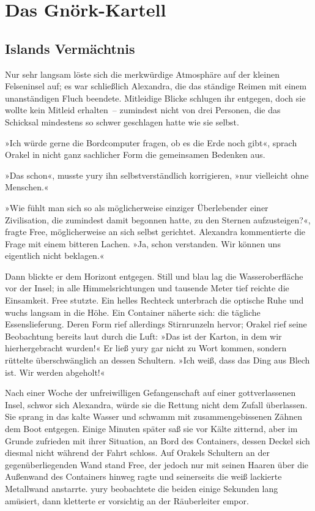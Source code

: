 \cleardoubleevenpage




\part{Das Gnörk-Kartell}

\chapter{Islands Vermächtnis}

Nur sehr langsam löste sich die merkwürdige Atmosphäre auf der kleinen Felseninsel auf; es war schließlich Alexandra, die das ständige Reimen mit einem unanständigen Fluch beendete. Mitleidige Blicke schlugen ihr entgegen, doch sie wollte kein Mitleid erhalten~– zumindest nicht von drei Personen, die das Schicksal mindestens so schwer geschlagen hatte wie sie selbst.

»Ich würde gerne die Bordcomputer fragen, ob es die Erde noch gibt«, sprach Orakel in nicht ganz sachlicher Form die gemeinsamen Bedenken aus.

»Das schon«, musste yury ihn selbstverständlich korrigieren, »nur vielleicht ohne Menschen.«

»Wie fühlt man sich so als möglicherweise einziger Überlebender einer Zivilisation, die zumindest damit begonnen hatte, zu den Sternen aufzusteigen?«, fragte Free, möglicherweise an sich selbst gerichtet. Alexandra kommentierte die Frage mit einem bitteren Lachen. »Ja, schon verstanden. Wir können uns eigentlich nicht beklagen.«

Dann blickte er dem Horizont entgegen. Still und blau lag die Wasseroberfläche vor der Insel; in alle Himmelsrichtungen und tausende Meter tief reichte die Einsamkeit. Free stutzte. Ein helles Rechteck unterbrach die optische Ruhe und wuchs langsam in die Höhe. Ein Container näherte sich: die tägliche Essenslieferung. Deren Form rief allerdings Stirnrunzeln hervor; Orakel rief seine Beobachtung bereits laut durch die Luft: »Das ist der Karton, in dem wir hierhergebracht wurden!« Er ließ yury gar nicht zu Wort kommen, sondern rüttelte überschwänglich an dessen Schultern. »Ich weiß, dass das Ding aus Blech ist. Wir werden abgeholt!«

Nach einer Woche der unfreiwilligen Gefangenschaft auf einer gottverlassenen Insel, schwor sich Alexandra, würde sie die Rettung nicht dem Zufall überlassen. Sie sprang in das kalte Wasser und schwamm mit zusammengebissenen Zähnen dem Boot entgegen. Einige Minuten später saß sie vor Kälte zitternd, aber im Grunde zufrieden mit ihrer Situation, an Bord des Containers, dessen Deckel sich diesmal nicht während der Fahrt schloss. Auf Orakels Schultern an der gegenüberliegenden Wand stand Free, der jedoch nur mit seinen Haaren über die Außenwand des Containers hinweg ragte und seinerseits die weiß lackierte Metallwand anstarrte. yury beobachtete die beiden einige Sekunden lang amüsiert, dann kletterte er vorsichtig an der Räuberleiter empor.

